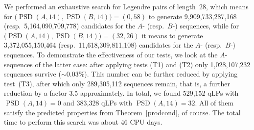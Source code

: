 \documentclass{article}
\theoremstyle{definition}
\newcommand{\PSD}{\operatorname{PSD}}
\begin{document}
We performed an exhaustive search for Legendre pairs of length~$28$, which means for $\bigl(\PSD(A,14),\PSD(B,14)\bigr)=(0,58)$ to generate 9,909,733,287,168 (resp.~5,164,090,709,778) candidates for the $A$- (resp.~$B$-) sequences, while for $\bigl(\PSD(A,14),\PSD(B,14)\bigr)=(32,26)$ it means to generate 3,372,055,150,464 (resp.~11,618,309,811,108) candidates for the $A$- (resp.~$B$-) sequences. To demonstrate the effectiveness of our tests, we look at the $A$-sequences of the latter case: after applying tests (T1) and (T2) only 1,028,107,232 sequences survive ($\sim 0.03\%$). This number can be further reduced by applying test~(T3), after which only 289,305,112 sequences remain, that is, a further reduction by a factor 3.5 approximately. In total, we found 529,152 qLPs with $\PSD(A,14)=0$ and 383,328 qLPs with $\PSD(A,14)=32$. All of them satisfy the predicted properties from Theorem~\ref{prodcond}, of course. The total time to perform this search was about 46 CPU days.
\end{document}
